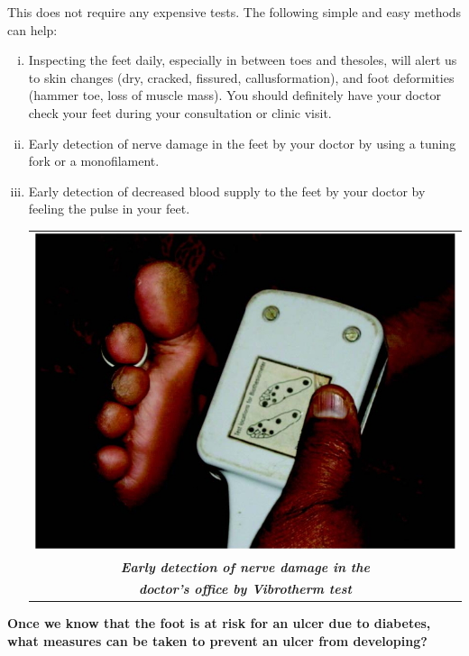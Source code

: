 This does not require any expensive tests. The following simple and easy methods can help:
\vspace{-\topsep}
\begin{enumerate}[i.] 
\itemsep=0pt
\item Inspecting the feet daily, especially in between toes and the\break soles, will alert us to skin changes (dry, cracked, fissured, callus\break formation), and foot deformities (hammer toe, loss of muscle mass). You should definitely have your doctor check your feet during your consultation or clinic visit.
\item Early detection of nerve damage in the feet by your doctor by using a tuning fork or a monofilament.
\item Early detection of decreased blood supply to the feet by your doctor by feeling the pulse in your feet.
\vspace{-\topsep}
\begin{center}
\begin{tabular}{@{}c@{}}
\includegraphics[scale=.7]{images/063.jpg}\\
{\small\textbf{\textit{Early detection of nerve damage in the}}}\\
{\small\textbf{\textit{doctor's office by Vibrotherm test}}}
\end{tabular}
\end{center}
\end{enumerate}
\vspace{-\topsep}

\noindent\textbf{Once we know that the foot is at risk for an ulcer due to diabetes, what measures can be taken to prevent an ulcer from developing?}

